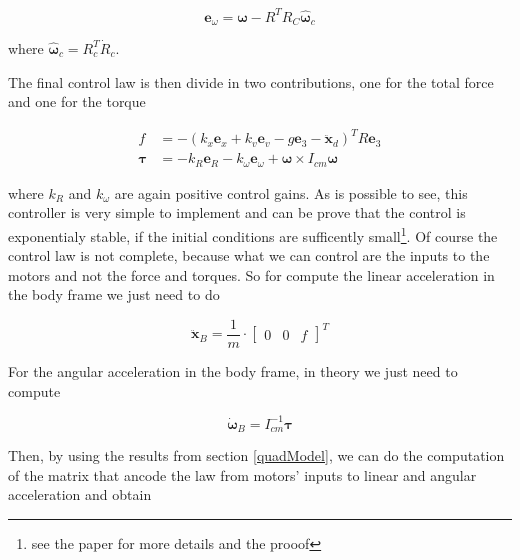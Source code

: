 \begin{equation}
	\mathbf{e}_{\omega} = \boldsymbol{\omega} - R^TR_C\hat{\boldsymbol{\omega}}_c
\end{equation}

\noindent where $\hat{\boldsymbol{\omega}}_c = R_c^T\dot{R}_c$.

\noindent The final control law is then divide in two contributions, one for the total force and one for the torque

\begin{align}
	f &= -(k_x\mathbf{e}_x+k_v\mathbf{e}_v-g\mathbf{e}_3-\ddot{\mathbf{x}}_d)^TR\mathbf{e}_3 \label{eq:LeeController1} \\
	\boldsymbol{\tau} &= -k_R\mathbf{e}_R - k_{\omega}\boldsymbol{e}_{\omega} + \boldsymbol{\omega}\times I_{cm}\boldsymbol{\omega} \label{eq:LeeController2} 
\end{align}

\noindent where $k_R$ and $k_{\omega}$ are again positive control gains. As is possible to see, this controller is very simple to implement and can be prove that the control is exponentialy stable, if the initial conditions are sufficently small\footnote{see the paper \cite{LeeController} for more details and the prooof}. Of course the control law is not complete, because what we can control are the inputs to the motors and not the force and torques. So for compute the linear acceleration in the body frame we just need to do 

\begin{equation}
	\ddot{\mathbf{x}}_B = \frac{1}{m}\cdot\begin{bmatrix}0 & 0 & f\end{bmatrix}^T
\end{equation}

\noindent For the angular acceleration in the body frame, in theory we just need to compute

\begin{equation}
	\dot{\boldsymbol{\omega}}_B = I_{cm}^{-1}\boldsymbol{\tau}
\end{equation}

\noindent Then, by using the results from section \ref{quadModel}, we can do the computation of the matrix that ancode the law from motors' inputs to linear and angular acceleration and obtain

